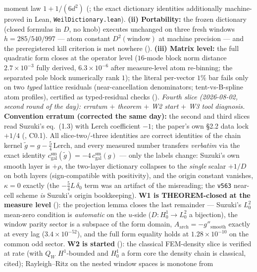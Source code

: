 \documentclass[11pt,a4paper]{article}
\begin{document}
moment law $1+1/(6d^2)$ (; the exact
dictionary identities additionally machine-proved in Lean,
\texttt{WeilDictionary.lean}).  \textbf{(ii) Portability:} the frozen
dictionary (closed formulas in $D$, no knob) executes unchanged on
three fresh windows $h=285/540/997$ --- atom constant
$D^2(\text{window})$ at machine precision --- and the preregistered
kill criterion is met nowhere ().
\textbf{(iii) Matrix level:} the full quadratic form closes at the
operator level ($16$-mode block norm distance $2.7\times10^{-3}$ fully
derived, $6.3\times10^{-6}$ after measure-level atom re-binning; the
separated pole block numerically rank $1$); the literal per-vector
$1\%$ bar fails only on two \emph{typed} lattice residuals
(near-cancellation denominators; tent-vs-B-spline atom profiles),
certified as typed-residual checks ().
\emph{Fourth slice (2026-08-02, second round of the day):
erratum $+$ theorem $+$ W2 start $+$ W3 tool diagnosis.}
\textbf{Convention erratum (corrected the same day):} the second and
third slices read Suzuki's eq.~(1.3) with Lerch coefficient $-1$; the
paper's own \S2.2 data lock $+1/4$ (,
C0.1).  All slice-two/-three identities are correct identities of the
chain kernel $\tilde g=g-\tfrac54\,$Lerch, and every measured number
transfers \emph{verbatim} via the exact identity
$c^{\mathrm{sm}}_{\mathrm{gal}}(\tilde g)=-4\,c^{\mathrm{sm}}_{\mathrm{gal}}(g)$
--- only the labels change: Suzuki's own smooth layer is $+\rho$, the
two-layer dictionary collapses to the \emph{single} scalar $+1/D$ on
both layers (sign-compatible with positivity), and the origin constant
vanishes, $\kappa=0$ exactly (the $-\tfrac54 L\,\delta_0$ term was an
artifact of the misreading; the \texttt{v563} near-cell scheme
\emph{is} Suzuki's origin bookkeeping).  \textbf{W1 is
THEOREM-closed at the measure level} ():
the projection lemma closes the last remainder --- Suzuki's $L^2_0$
mean-zero condition is \emph{automatic} on the $u$-side
($D:H^1_0\to L^2_0$ a bijection), the window parity sector is a
subspace of the form domain, $A_{\mathrm{arch}}=-g''_{\mathrm{smooth}}$
exactly at every lag ($3.4\times10^{-52}$), and the full form equality
holds at $1.28\times10^{-10}$ on the common odd sector.
\textbf{W2 is started} (): the
classical FEM-density slice is verified at rate (with $Q_W$
$H^1$-bounded and $H^1_0$ a form core the density chain is classical,
cited); Rayleigh--Ritz on the nested window spaces is monotone from
\end{document}

